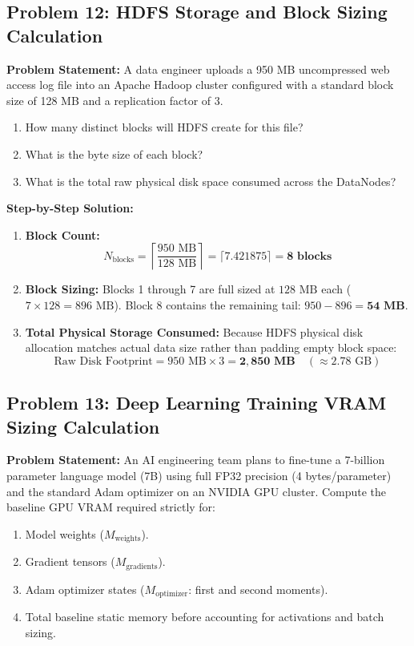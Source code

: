 \subsection*{Problem 12: HDFS Storage and Block Sizing Calculation}
\textbf{Problem Statement:} A data engineer uploads a 950 MB uncompressed web access log file into an Apache Hadoop cluster configured with a standard block size of 128 MB and a replication factor of 3.
\begin{enumerate}[label=(\alph*)]
    \item How many distinct blocks will HDFS create for this file?
    \item What is the byte size of each block?
    \item What is the total raw physical disk space consumed across the DataNodes?
\end{enumerate}

\textbf{Step-by-Step Solution:}
\begin{enumerate}[label=(\alph*)]
    \item \textbf{Block Count:}
    \[
    N_{\text{blocks}} = \left\lceil \frac{950\text{ MB}}{128\text{ MB}} \right\rceil = \lceil 7.421875 \rceil = \mathbf{8\text{ blocks}}
    \]
    \item \textbf{Block Sizing:}
    Blocks 1 through 7 are full sized at $128\text{ MB}$ each ($7 \times 128 = 896\text{ MB}$).
    Block 8 contains the remaining tail: $950 - 896 = \mathbf{54\text{ MB}}$.
    \item \textbf{Total Physical Storage Consumed:}
    Because HDFS physical disk allocation matches actual data size rather than padding empty block space:
    \[
    \text{Raw Disk Footprint} = 950\text{ MB} \times 3 = \mathbf{2,850\text{ MB}} \quad (\approx 2.78\text{ GB})
    \]
\end{enumerate}

\subsection*{Problem 13: Deep Learning Training VRAM Sizing Calculation}
\textbf{Problem Statement:} An AI engineering team plans to fine-tune a 7-billion parameter language model (7B) using full FP32 precision (4 bytes/parameter) and the standard Adam optimizer on an NVIDIA GPU cluster.
Compute the baseline GPU VRAM required strictly for:
\begin{enumerate}[label=(\alph*)]
    \item Model weights ($M_{\text{weights}}$).
    \item Gradient tensors ($M_{\text{gradients}}$).
    \item Adam optimizer states ($M_{\text{optimizer}}$: first and second moments).
    \item Total baseline static memory before accounting for activations and batch sizing.
\end{enumerate}

